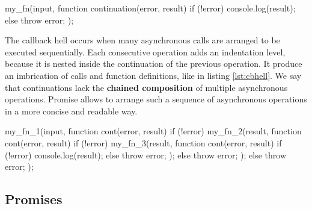 \begin{code}[js, %
             caption={Example of a continuation}, %
             label={lst:continuation}] %
my_fn(input, function continuation(error, result) {
  if (!error) {
    console.log(result);
  } else {
    throw error;
  }
});
\end{code}

The callback hell occurs when many asynchronous calls are arranged to be executed sequentially.
Each consecutive operation adds an indentation level, because it is nested inside the continuation of the previous operation.
It produce an imbrication of calls and function definitions, like in listing \ref{lst:cbhell}.
We say that continuations lack the \textbf{chained composition} of multiple asynchronous operations.
Promise allows to arrange such a sequence of asynchronous operations in a more concise and readable way.


\begin{code}[js, %
             caption={Example of a sequence of continuations}, %
             label={lst:cbhell}] %
my_fn_1(input, function cont(error, result) {
  if (!error) {
    my_fn_2(result, function cont(error, result) {
      if (!error) {
        my_fn_3(result, function cont(error, result) {
          if (!error) {
            console.log(result);
          } else {
            throw error;
          }
        });
      } else {
        throw error;
      }
    });
  } else {
    throw error;
  }
});
\end{code}

\subsection{Promises} \label{section:definitions:promise}


